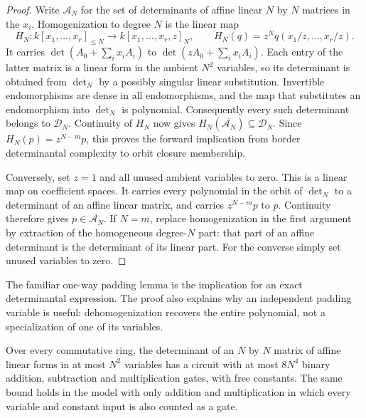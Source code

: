 \begin{proof}
Write $\mathcal A_N$ for the set of determinants of affine linear
$N$ by $N$ matrices in the $x_i$.  Homogenization to degree $N$ is the
linear map
\[
 H_N:k[x_1,\ldots,x_r]_{\leq N}\longrightarrow
 k[x_1,\ldots,x_r,z]_N,
 \qquad H_N(q)=z^Nq(x_1/z,\ldots,x_r/z).
\]
It carries $\det(A_0+\sum_i x_iA_i)$ to
$\det(zA_0+\sum_i x_iA_i)$.  Each entry of the latter matrix is a
linear form in the ambient $N^2$ variables, so its determinant is
obtained from $\det_N$ by a possibly singular linear substitution.
Invertible endomorphisms are dense in all endomorphisms, and the map
that substitutes an endomorphism into $\det_N$ is polynomial.
Consequently every such determinant belongs to $\mathcal D_N$.
Continuity of $H_N$ now gives
$H_N(\overline{\mathcal A_N})\subseteq\mathcal D_N$.
Since $H_N(p)=z^{N-m}p$, this proves the forward implication from
border determinantal complexity to orbit closure membership.

Conversely, set $z=1$ and all unused ambient variables to zero.  This
is a linear map on coefficient spaces.  It carries every polynomial
in the orbit of $\det_N$ to a determinant of an affine linear matrix,
and carries $z^{N-m}p$ to $p$.  Continuity therefore gives
$p\in\overline{\mathcal A_N}$.  If $N=m$, replace homogenization
in the first argument by extraction of the homogeneous degree-$N$
part: that part of an affine determinant is the determinant of its
linear part.  For the converse simply set unused variables to zero.
\end{proof}

The familiar one-way padding lemma is the implication for an exact
determinantal expression.  The proof also explains why an independent
padding variable is useful: dehomogenization recovers the entire
polynomial, not a specialization of one of its variables.

\begin{lemma}\label{lem:det-circuit}
Over every commutative ring, the determinant of an $N$ by $N$ matrix
of affine linear forms in at most $N^2$ variables has a circuit with
at most $8N^4$ binary addition, subtraction and multiplication gates,
with free constants.  The same bound holds in the model with only
addition and multiplication in which every variable and constant
input is also counted as a gate.
\end{lemma}

